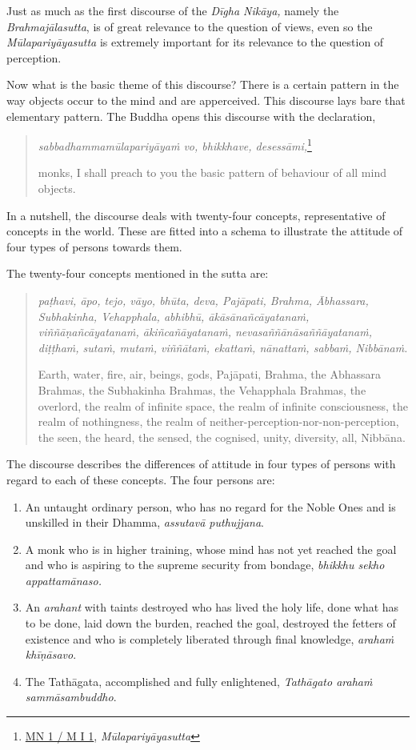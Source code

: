Just as much as the first discourse of the \emph{Dīgha Nikāya,} namely the \emph{Brahmajālasutta}, is of great relevance to the question of views, even so the \emph{Mūlapariyāyasutta} is extremely important for its relevance to the question of perception.

Now what is the basic theme of this discourse? There is a certain pattern in the way objects occur to the mind and are apperceived. This discourse lays bare that elementary pattern. The Buddha opens this discourse with the declaration,

\begin{quote}
\emph{sabbadhammamūlapariyāyaṁ vo, bhikkhave, desessāmi,}\footnote{\href{https://suttacentral.net/mn1/pli/ms}{MN 1 / M I 1}, \emph{Mūlapariyāyasutta}}

monks, I shall preach to you the basic pattern of behaviour of all mind objects.
\end{quote}

In a nutshell, the discourse deals with twenty-four concepts, representative of concepts in the world. These are fitted into a schema to illustrate the attitude of four types of persons towards them.

The twenty-four concepts mentioned in the sutta are:

\begin{quote}
\emph{paṭhavi, āpo, tejo, vāyo, bhūta, deva, Pajāpati, Brahma, Ābhassara, Subhakinha, Vehapphala, abhibhū, ākāsānañcāyatanaṁ, viññāṇañcāyatanaṁ, ākiñcañāyatanaṁ, nevasaññānāsaññāyatanaṁ, diṭṭhaṁ, sutaṁ, mutaṁ, viññātaṁ, ekattaṁ, nānattaṁ, sabbaṁ, Nibbānaṁ.}

Earth, water, fire, air, beings, gods, Pajāpati, Brahma, the Abhassara Brahmas, the Subhakinha Brahmas, the Vehapphala Brahmas, the overlord, the realm of infinite space, the realm of infinite consciousness, the realm of nothingness, the realm of neither-perception-nor-non-perception, the seen, the heard, the sensed, the cognised, unity, diversity, all, Nibbāna.
\end{quote}

The discourse describes the differences of attitude in four types of persons with regard to each of these concepts. The four persons are:

\begin{enumerate}
\def\labelenumi{\arabic{enumi}.}
\item
  An untaught ordinary person, who has no regard for the Noble Ones and is unskilled in their Dhamma, \emph{assutavā puthujjana}.
\item
  A monk who is in higher training, whose mind has not yet reached the goal and who is aspiring to the supreme security from bondage, \emph{bhikkhu sekho appattamānaso.}
\item
  An \emph{arahant} with taints destroyed who has lived the holy life, done what has to be done, laid down the burden, reached the goal, destroyed the fetters of existence and who is completely liberated through final knowledge, \emph{arahaṁ khīṇāsavo}.
\item
  The Tathāgata, accomplished and fully enlightened, \emph{Tathāgato arahaṁ sammāsambuddho}.
\end{enumerate}

